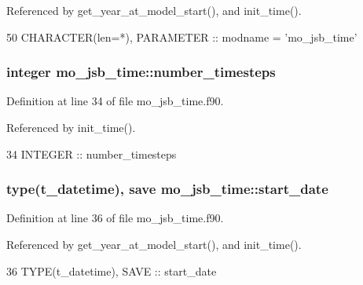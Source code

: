 Referenced by get\+\_\+year\+\_\+at\+\_\+model\+\_\+start(), and init\+\_\+time().


\begin{DoxyCode}
50   \textcolor{keywordtype}{CHARACTER(len=*)}, \textcolor{keywordtype}{PARAMETER} :: modname = \textcolor{stringliteral}{'mo\_jsb\_time'}
\end{DoxyCode}
\hypertarget{namespacemo__jsb__time_ab33d9e53cde817560aa3730633ea1413}{}
\subsubsection[{number\+\_\+timesteps}]{\setlength{\rightskip}{0pt plus 5cm}integer mo\+\_\+jsb\+\_\+time\+::number\+\_\+timesteps}\label{namespacemo__jsb__time_ab33d9e53cde817560aa3730633ea1413}


Definition at line 34 of file mo\+\_\+jsb\+\_\+time.\+f90.



Referenced by init\+\_\+time().


\begin{DoxyCode}
34   \textcolor{keywordtype}{INTEGER}                :: number\_timesteps
\end{DoxyCode}
\hypertarget{namespacemo__jsb__time_afa7b526c3dff7e0c063d6545e6eae499}{}
\subsubsection[{start\+\_\+date}]{\setlength{\rightskip}{0pt plus 5cm}type(t\+\_\+datetime), save mo\+\_\+jsb\+\_\+time\+::start\+\_\+date}\label{namespacemo__jsb__time_afa7b526c3dff7e0c063d6545e6eae499}


Definition at line 36 of file mo\+\_\+jsb\+\_\+time.\+f90.



Referenced by get\+\_\+year\+\_\+at\+\_\+model\+\_\+start(), and init\+\_\+time().


\begin{DoxyCode}
36   \textcolor{keywordtype}{TYPE}(t\_datetime), \textcolor{keywordtype}{SAVE} :: start\_date
\end{DoxyCode}
\hypertarget{namespacemo__jsb__time_ac404f6055d48b37e7de92b0e288f5a8c}{}
